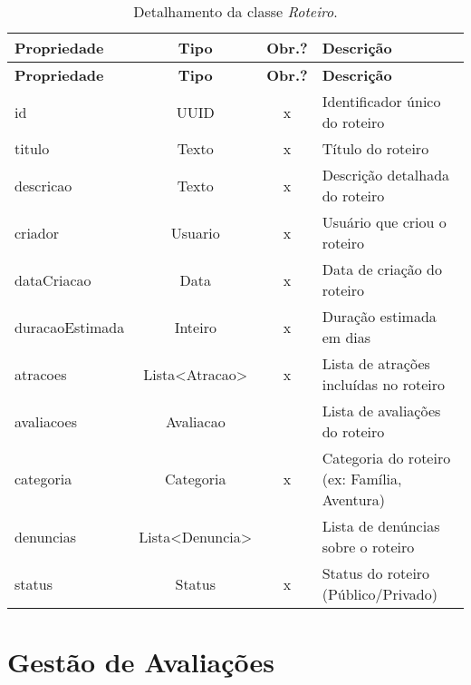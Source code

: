 \begin{longtable}{|p{3.5cm}|c|c|p{8cm}|}
    \caption{Detalhamento da classe \emph{Roteiro}.}
    \label{tbl-dicionario-roteiro} \\\hline 
    
    \rowcolor{lightgray}
    \textbf{Propriedade} & \textbf{Tipo} & \textbf{Obr.?} & \textbf{Descrição} \\\hline
    \endfirsthead
    \hline
    \rowcolor{lightgray}
    \textbf{Propriedade} & \textbf{Tipo} & \textbf{Obr.?} & \textbf{Descrição} \\\hline
    \endhead
    
    id & UUID & x & Identificador único do roteiro \\\hline
    titulo & Texto & x & Título do roteiro \\\hline
    descricao & Texto & x & Descrição detalhada do roteiro \\\hline
    criador & Usuario & x & Usuário que criou o roteiro \\\hline
    dataCriacao & Data & x & Data de criação do roteiro \\\hline
    duracaoEstimada & Inteiro & x & Duração estimada em dias \\\hline
    atracoes & Lista<Atracao> & x & Lista de atrações incluídas no roteiro \\\hline
    avaliacoes & Avaliacao & & Lista de avaliações do roteiro \\\hline
    categoria & Categoria & x & Categoria do roteiro (ex: Família, Aventura) \\\hline
	denuncias & Lista<Denuncia> & & Lista de denúncias sobre o roteiro \\\hline
    status & Status & x & Status do roteiro (Público/Privado) \\\hline
\end{longtable}

\section{Gestão de Avaliações}
\label{sec-dicionario-avaliacoes}

